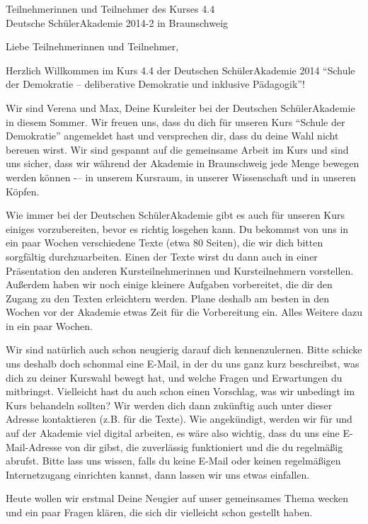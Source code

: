 \documentclass[a4paper]{letter}
\date{15.\ April 2014}
\begin{document}
\begin{letter}{
	Teilnehmerinnen und Teilnehmer des Kurses 4.4 \\
	Deutsche SchülerAkademie 2014-2 in Braunschweig}

\opening{Liebe Teilnehmerinnen und Teilnehmer,}

Herzlich Willkommen im Kurs 4.4 der Deutschen SchülerAkademie 2014 ``Schule der Demokratie -- deliberative Demokratie und inklusive Pädagogik''!

Wir sind Verena und Max, Deine Kursleiter bei der Deutschen SchülerAkademie in diesem Sommer.
Wir freuen uns, dass du dich für unseren Kurs ``Schule der Demokratie'' angemeldet hast und versprechen dir, dass du deine Wahl nicht bereuen wirst.
Wir sind gespannt auf die gemeinsame Arbeit im Kurs und sind uns sicher, dass wir während der Akademie in Braunschweig jede Menge bewegen werden können -– in unserem Kursraum, in unserer Wissenschaft und in unseren Köpfen.

Wie immer bei der Deutschen SchülerAkademie gibt es auch für unseren Kurs einiges vorzubereiten, bevor es richtig losgehen kann.
Du bekommst von uns in ein paar Wochen verschiedene Texte (etwa 80 Seiten), die wir dich bitten sorgfältig durchzuarbeiten.
Einen der Texte wirst du dann auch in einer Präsentation den anderen Kursteilnehmerinnen und Kursteilnehmern vorstellen.
Außerdem haben wir noch einige kleinere Aufgaben vorbereitet, die dir den Zugang zu den Texten erleichtern werden.
Plane deshalb am besten in den Wochen vor der Akademie etwas Zeit für die Vorbereitung ein.
Alles Weitere dazu in ein paar Wochen.

Wir sind natürlich auch schon neugierig darauf dich kennenzulernen.
Bitte schicke uns deshalb doch schonmal eine E-Mail, in der du uns ganz kurz beschreibst, was dich zu deiner Kurswahl bewegt hat, und welche Fragen und Erwartungen du mitbringst.
Vielleicht hast du auch schon einen Vorschlag, was wir unbedingt im Kurs behandeln sollten?
Wir werden dich dann zukünftig auch unter dieser Adresse kontaktieren (z.B. für die Texte).
Wie angekündigt, werden wir für und auf der Akademie viel digital arbeiten, es wäre also wichtig, dass du uns eine E-Mail-Adresse von dir gibst, die zuverlässig funktioniert und die du regelmäßig abrufst.
Bitte lass uns wissen, falls du keine E-Mail oder keinen regelmäßigen Internetzugang einrichten kannst, dann lassen wir uns etwas einfallen.

Heute wollen wir erstmal Deine Neugier auf unser gemeinsames Thema wecken und ein paar Fragen klären, die sich dir vielleicht schon gestellt haben.


\end{letter}
\end{document}
